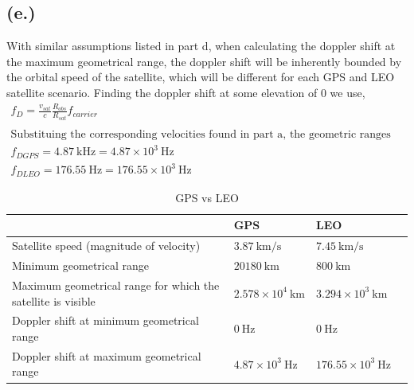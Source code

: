 \documentclass[11pt]{article}
\begin{document}
\subsection*{(e.)}
\hspace*{2em}With similar assumptions listed in part d, when calculating the doppler shift at the maximum geometrical range, the doppler shift will be inherently bounded by the orbital speed of the satellite, which will be different for each GPS and LEO satellite scenario. Finding the doppler shift at some elevation of 0 we use,
\begin{gather*}
f_D = \frac{v_{sat}}{c} \frac{R_{obs}}{R_{sat}} f_{carrier} \\
\\
\text{Substituing the corresponding velocities found in part a, the geometric ranges in part b, and the given carrier frequencies of each satellite, we find that,} \\
\boxed{f_{D GPS} = 4.87~\mathrm{kHz} = 4.87\times10^3~\mathrm{Hz}} \\
\boxed{f_{D LEO} = 176.55~\mathrm{Hz} = 176.55\times10^3~\mathrm{Hz}}
\end{gather*} 

\begin{table}[h!]
\centering
\renewcommand{\arraystretch}{2}
\begin{tabular}{|p{8cm}|p{4cm}|p{4cm}|p{4cm}|}
\hline
& GPS & LEO \\ \hline

Satellite speed (magnitude of velocity)
& $3.87~\mathrm{km/s}$ & $7.45~\mathrm{km/s}$ \\ \hline

Minimum geometrical range
& $20180~\mathrm{km}$ & $800~\mathrm{km}$ \\ \hline

Maximum geometrical range for which the satellite is visible
& $2.578\times10^4~\mathrm{km}$ & $3.294\times10^3~\mathrm{km}$ \\ \hline

Doppler shift at minimum geometrical range
& $0~\mathrm{Hz}$ & $0~\mathrm{Hz}$ \\ \hline

Doppler shift at maximum geometrical range
& $4.87\times10^3~\mathrm{Hz}$ & $176.55\times10^3~\mathrm{Hz}$ \\ \hline

\end{tabular}
\caption{GPS vs LEO}
\label{tab:GPSvLEO}
\end{table}
\end{document}
